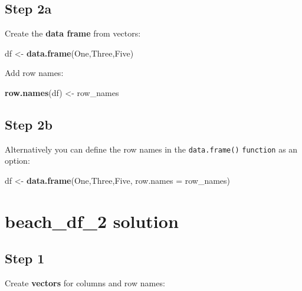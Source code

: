 \documentclass[]{book}
\newenvironment{Shaded}{\begin{snugshade}}{\end{snugshade}}
\newcommand{\KeywordTok}[1]{\textcolor[rgb]{0.13,0.29,0.53}{\textbf{#1}}}
\newcommand{\DataTypeTok}[1]{\textcolor[rgb]{0.13,0.29,0.53}{#1}}
\newcommand{\StringTok}[1]{\textcolor[rgb]{0.31,0.60,0.02}{#1}}
\newcommand{\NormalTok}[1]{#1}
\begin{document}
\subsection{Step 2a}\label{step-2a}

Create the \textbf{data frame} from vectors:

\begin{Shaded}
\begin{Highlighting}[]
\NormalTok{df <-}\StringTok{ }\KeywordTok{data.frame}\NormalTok{(One,Three,Five)}
\end{Highlighting}
\end{Shaded}

Add row names:

\begin{Shaded}
\begin{Highlighting}[]
\KeywordTok{row.names}\NormalTok{(df) <-}\StringTok{ }\NormalTok{row_names}
\end{Highlighting}
\end{Shaded}

\subsection{Step 2b}\label{step-2b}

Alternatively you can define the row names in the \texttt{data.frame()}
\texttt{function} as an option:

\begin{Shaded}
\begin{Highlighting}[]
\NormalTok{df <-}\StringTok{ }\KeywordTok{data.frame}\NormalTok{(One,Three,Five, }\DataTypeTok{row.names =}\NormalTok{ row_names)}
\end{Highlighting}
\end{Shaded}

\section{beach\_df\_2 solution}\label{beach_df_2-solution}

\subsection{Step 1}\label{step-1-1}

Create \textbf{vectors} for columns and row names:
\end{document}
